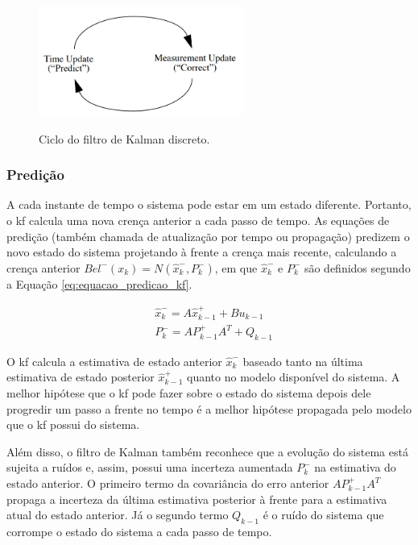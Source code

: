 \documentclass[acronym, symbols]{fei}
\begin{document}
			\begin{figure}[!htb]
				\centering
				\caption{Ciclo do filtro de Kalman discreto.} 
				\includegraphics[width=0.6\textwidth]{predicao_atualizacao_kalman.png}
				\label{fig:predicao_atualizacao_kalman}
			\end{figure}
			
			\subsubsection{Predição}
				A cada instante de tempo o sistema pode estar em um estado diferente. Portanto, o \acrshort{kf} calcula uma nova crença anterior a cada passo de tempo. As equações de predição (também chamada de atualização por tempo ou propagação) predizem o novo estado do sistema projetando à frente a crença mais recente, calculando a crença anterior $Bel^{-}(x_k) = N(\hat{x}_{k}^{-},P_{k}^{-})$, em que $\hat{x}_{k}^{-}$ e $P_{k}^{-}$ são definidos segundo a Equação \eqref{eq:equacao_predicao_kf}.
				
				\begin{equation} \label{eq:equacao_predicao_kf}
					\begin{split}
						&\hat{x}_{k}^{-} = A\hat{x}_{k-1}^{+} + Bu_{k-1} \\
						&P_{k}^{-} = AP_{k-1}^{+}A^{T} + Q_{k-1}					
					\end{split}
				\end{equation}
			
				O \acrshort{kf} calcula a estimativa de estado anterior $\hat{x}_{k}^{-}$ baseado tanto na última estimativa de estado posterior $\hat{x}_{k-1}^{+}$ quanto no modelo disponível do sistema. A melhor hipótese que o \acrshort{kf} pode fazer sobre o estado do sistema depois dele progredir um passo a frente no tempo é a melhor hipótese propagada pelo modelo que o \acrshort{kf} possui do sistema.
				
				Além disso, o filtro de Kalman também reconhece que a evolução do sistema está sujeita a ruídos e, assim, possui uma incerteza aumentada $P_{k}^{-}$ na estimativa do estado anterior. O primeiro termo da covariância do erro anterior $AP_{k-1}^{+}A^{T}$ propaga a incerteza da última estimativa posterior à frente para a estimativa atual do estado anterior. Já o segundo termo $Q_{k-1}$ é o ruído do sistema que corrompe o estado do sistema a cada passo de tempo.
			
\end{document}
